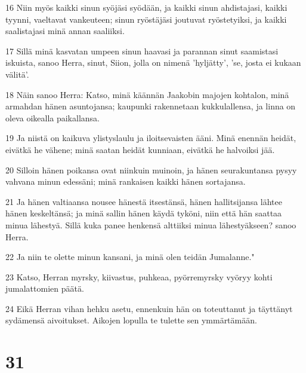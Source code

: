 \par 16 Niin myös kaikki sinun syöjäsi syödään, ja kaikki sinun ahdistajasi, kaikki tyynni, vaeltavat vankeuteen; sinun ryöstäjäsi joutuvat ryöstetyiksi, ja kaikki saalistajasi minä annan saaliiksi.
\par 17 Sillä minä kasvatan umpeen sinun haavasi ja parannan sinut saamistasi iskuista, sanoo Herra, sinut, Siion, jolla on nimenä 'hyljätty', 'se, josta ei kukaan välitä'.
\par 18 Näin sanoo Herra: Katso, minä käännän Jaakobin majojen kohtalon, minä armahdan hänen asuntojansa; kaupunki rakennetaan kukkulallensa, ja linna on oleva oikealla paikallansa.
\par 19 Ja niistä on kaikuva ylistyslaulu ja iloitsevaisten ääni. Minä enennän heidät, eivätkä he vähene; minä saatan heidät kunniaan, eivätkä he halvoiksi jää.
\par 20 Silloin hänen poikansa ovat niinkuin muinoin, ja hänen seurakuntansa pysyy vahvana minun edessäni; minä rankaisen kaikki hänen sortajansa.
\par 21 Ja hänen valtiaansa nousee hänestä itsestänsä, hänen hallitsijansa lähtee hänen keskeltänsä; ja minä sallin hänen käydä tyköni, niin että hän saattaa minua lähestyä. Sillä kuka panee henkensä alttiiksi minua lähestyäkseen? sanoo Herra.
\par 22 Ja niin te olette minun kansani, ja minä olen teidän Jumalanne."
\par 23 Katso, Herran myrsky, kiivastus, puhkeaa, pyörremyrsky vyöryy kohti jumalattomien päätä.
\par 24 Eikä Herran vihan hehku asetu, ennenkuin hän on toteuttanut ja täyttänyt sydämensä aivoitukset. Aikojen lopulla te tulette sen ymmärtämään.

\chapter{31}

